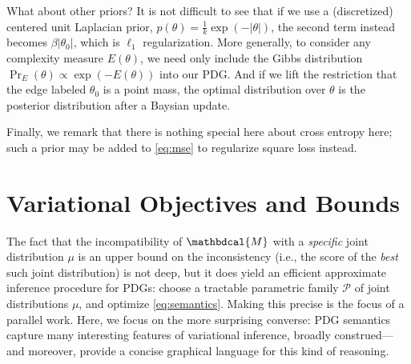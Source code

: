 \documentclass{article}
\theoremstyle{plain}
\theoremstyle{definition}
\newcommand{\dg}[1]{\mathbdcal{#1}}
\newcommand\todo{\textcolor{red}{Todo: }}
\begin{document}
What about other priors? It is not difficult to see that if we use a (discretized) centered unit Laplacian prior, $p(\theta) = \frac1k \exp(-|\theta|)$, the second term instead becomes $\beta |\theta_0|$, which is $\ell_1$ regularization.
More generally, to consider any complexity measure $E(\theta)$, we need only include the Gibbs distribution $\Pr_E(\theta) \propto \exp(-E(\theta))$ into our PDG. 
And if we lift the restriction that the edge labeled $\theta_0$ is a point mass, the optimal distribution over $\theta$ is the posterior distribution after a Baysian update. 

Finally, we remark that there is nothing special here about cross entropy here; such a prior may be added to \eqref{eq:mse} to regularize square loss instead.

\section{Variational Objectives and Bounds}
\label{sec:theory}





The fact that the incompatibility of $\dg M$ with a \emph{specific} joint distribution $\mu$ is an upper bound on the inconsistency (i.e., the score of the \emph{best} such joint distribution) is not deep, but it does yield an efficient approximate inference procedure for PDGs: choose a tractable parametric family $\mathcal P$ of joint distributions $\mu$, and optimize \eqref{eq:semantics}. Making this precise is the focus of a parallel work.
Here, we focus on the more surprising converse:  PDG semantics capture many interesting features of variational inference, broadly construed--- and moreover, provide a concise graphical language for this kind of reasoning.
\end{document}
